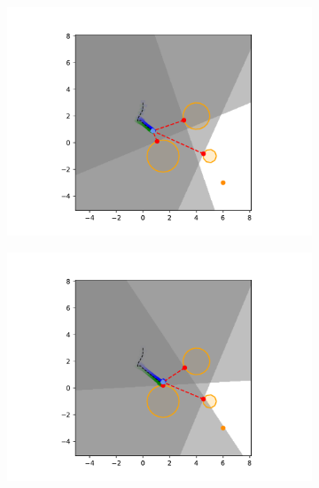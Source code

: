 \begin{figure}[H]
\begin{subfigure}{0.20\textwidth}
        \includegraphics[width=\textwidth]{figures/Simulations/sim1circles/frame_2.pdf}
    \end{subfigure}%
    \hfill
    \begin{subfigure}{0.20\textwidth}
        \centering
        \includegraphics[width=\textwidth]{figures/Simulations/sim1circles/frame_3.pdf}
    \end{subfigure}%
    \hfill
    \begin{subfigure}{0.20\textwidth}
        \centering

\end{subfigure}
\end{figure}
